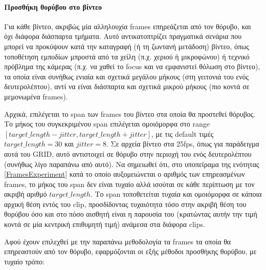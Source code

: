 \paragraph{Προσθήκη θορύβου στο βίντεο}

Για κάθε βίντεο, ακριβώς μία αλληλουχία frames επηρεάζεται από τον θόρυβο, και όχι διάφορα διάσπαρτα τμήματα. Αυτό αντικατοπτρίζει πραγματικά σενάρια που μπορεί να προκύψουν κατά την καταγραφή (ή τη ζωντανή μετάδοση) βίντεο, όπως τοποθέτηση εμποδίων μπροστά από τα χείλη (π.χ. χεριού ή μικροφώνου) ή τεχνικό πρόβλημα της κάμερας (π.χ. να χαθεί το focus και να εμφανιστεί θόλωση στο βίντεο), τα οποία είναι συνήθως ενιαία και σχετικά μεγάλου μήκους (στη γειτονιά του ενός δευτερολέπτου), αντί να είναι διάσπαρτα και σχετικά μικρού μήκους (πιο κοντά σε μεμονωμένα frames).

Αρχικά, επιλέγεται το span των frames του βίντεο στα οποία θα προστεθεί θόρυβος. Το μήκος του συγκεκριμένου span επιλέγεται ομοιόμορφα στο range $[target\_length - jitter, target\_length + jitter]$, με τις default τιμές $target\_length = 30$ και $jitter = 8$. Σε αρχεία βίντεο στα 25fps, όπως για παράδειγμα αυτά του GRID, αυτό αντιστοιχεί σε θόρυβο στην περιοχή του ενός δευτερολέπτου (συνήθως λίγο παραπάνω από αυτό). Να σημειωθεί ότι, στο υποπείραμα της ενότητας \ref{FramesExperiment} κατά το οποίο αυξομειώνεται ο αριθμός των επηρεασμένων frames, το μήκος του span δεν είναι τυχαίο αλλά ισούται σε κάθε περίπτωση με τον ακριβή αριθμό $target\_length$. Το span τοποθετείται τυχαία και ομοιόμορφα σε κάποια αρχική θέση εντός του clip, προσδίδοντας τυχαιότητα τόσο στην ακριβή θέση του θορύβου όσο και στο πόσο αισθητή είναι η παρουσία του (κρατώντας αυτήν την τιμή κοντά σε μία κεντρική επιθυμητή τιμή) ανάμεσα στα διάφορα clips.

Αφού έχουν επιλεχθεί με την παραπάνω μεθοδολογία τα frames τα οποία θα επηρεαστούν από τον θόρυβο, εφαρμόζονται οι εξής μέθοδοι προσθήκης θορύβου, με τυχαίο τρόπο:

